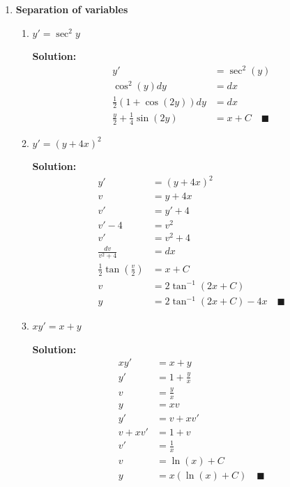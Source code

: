 \documentclass[letterpaper, fontsize=12pt]{scrartcl} %
\numberwithin{equation}{section} %
\numberwithin{figure}{section} %
\numberwithin{table}{section} %
\begin{document}
\begin{enumerate}


\item \textbf{Separation of variables}
\begin{enumerate}[label = (\alph*)]
\item $y ' = \sec^2 y$

\par \textbf{Solution:}
\begin{align*}
y' &= \sec^2( y) \\
\cos^2(y)dy &= dx \\
\frac{1}{2} (1 + \cos(2y))dy &= dx \\
\frac{y}{2} + \frac{1}{4} \sin(2y) &= x + C \quad\blacksquare
\end{align*}

\item $y' = (y + 4x)^2$

\par \textbf{Solution:}
\begin{align*}
y' &= (y + 4x)^2 \\
v &= y + 4x \\
v' &= y' + 4 \\
v' - 4 &= v^2 \\
v' &= v^2 + 4 \\
\frac{dv}{v^2 + 4} &= dx \\
\frac{1}{2} \tan \left( \frac{v}{2}\right) &= x + C \\
v &= 2\tan^{-1}(2x + C) \\
y &= 2\tan^{-1}(2x + C) - 4x \quad\blacksquare 
\end{align*}

\item $xy' = x + y$

\par \textbf{Solution:}
\begin{align*}
xy' &= x + y \\
y' &= 1 + \frac{y}{x} \\
v &= \frac{y}{x} \\
y &= xv \\
y' &= v + x v' \\
v + x v' &= 1 + v \\
v' &= \frac{1}{x} \\
v &= \ln(x) + C\\
y &= x(\ln(x) + C) \quad\blacksquare
\end{align*}

\end{enumerate}



\end{enumerate}
\end{document}
